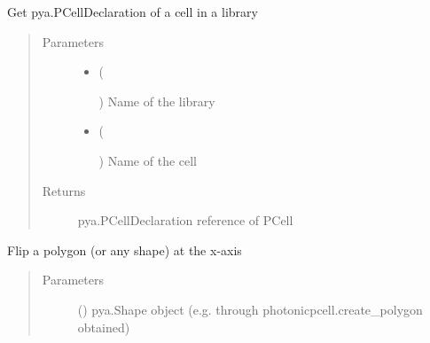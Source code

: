 \documentclass[a4paper,10pt,english]{sphinxmanual}
\begin{document}
\begin{fulllineitems}

\begin{fulllineitems}
\label{\detokenize{photonics/photonics:kppc.photonics.PhotDevice.decl}}
Get pya.PCellDeclaration of a cell in a library
\begin{quote}\begin{description}
\item[{Parameters}] \leavevmode\begin{itemize}
\item {} 
 (%
\begin{footnote}[66]\sphinxAtStartFootnote
{}
%
\end{footnote}) \textendash{} Name of the library

\item {} 
 (%
\begin{footnote}[67]\sphinxAtStartFootnote
{}
%
\end{footnote}) \textendash{} Name of the cell

\end{itemize}

\item[{Returns}] \leavevmode
pya.PCellDeclaration reference of PCell

\end{description}\end{quote}

\end{fulllineitems}


\begin{fulllineitems}
\label{\detokenize{photonics/photonics:kppc.photonics.PhotDevice.flip_shape_xaxis}}
Flip a polygon (or any shape) at the x-axis
\begin{quote}\begin{description}
\item[{Parameters}] \leavevmode
{} () \textendash{} pya.Shape object (e.g. through photonicpcell.create\_polygon obtained)


\end{description}
\end{quote}
\end{fulllineitems}
\end{fulllineitems}
\end{document}
